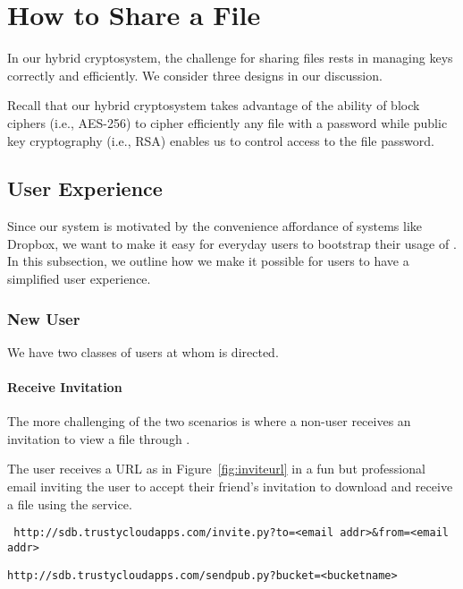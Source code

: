 \section{How to Share a File}

In our hybrid cryptosystem, the challenge for sharing files rests in
managing keys correctly and efficiently. We consider three designs in
our discussion.

Recall that our hybrid cryptosystem takes advantage of the ability of
block ciphers (i.e., AES-256) to cipher efficiently any file with a
password while public key cryptography (i.e., RSA) enables us to
control access to the file password.

\subsection{User Experience}

Since our system is motivated by the convenience affordance of systems
like Dropbox, we want to make it easy for everyday users to bootstrap
their usage of \name. In this subsection, we outline how we make it
possible for users to have a simplified user experience.

\subsubsection*{New \name User}

We have two classes of users at whom \name is directed.

\paragraph{Receive Invitation} The more challenging of the two
scenarios is where a non-\name user receives an invitation to view a
file through \name.

The user receives a URL as in Figure~\ref{fig:inviteurl} in a fun but
professional email inviting the user to accept their friend's
invitation to download \name and receive a file using the \name
service.

\begin{figure*} {\tt
    http://sdb.trustycloudapps.com/invite.py?to=<email
    addr>\&from=<email addr>}
\caption{What the URL looks like.}
\label{fig:inviteurl}
\end{figure*}

\begin{figure*}
{\tt http://sdb.trustycloudapps.com/sendpub.py?bucket=<bucketname>}
\caption{For each bucket in the \name system, we store the public keys
  in a predefined object name in the bucket. This object contains a
  JSON-formatted dictionary of (location, public key) pairs for the
  bucket owner's email address. This makes it easy to locate the keys
  and share the identity with the friend.}
\label{fig:inviteurl}
\end{figure*}


